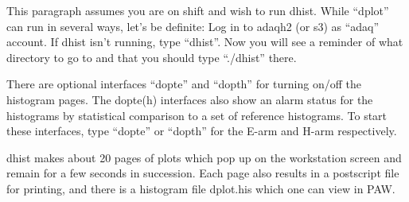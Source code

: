 \par 
This paragraph assumes you are on shift
and wish to run dhist.  
While ``dplot'' can run in
several ways, let's be definite:  Log in to
adaqh2 (or s3) as ``adaq'' account.  If dhist
isn't running, type ``dhist''.  Now you will
see a reminder of what directory to go to and
that you should type ``./dhist'' there.

\par 
There are optional interfaces ``dopte'' and 
``dopth'' for turning on/off the histogram
pages.  The dopte(h) interfaces also show an 
alarm status for the histograms by statistical
comparison to a set of reference histograms.
To start these interfaces, type ``dopte'' or
``dopth'' for the E-arm and H-arm respectively.

\par 
dhist makes about 20 pages of plots which pop
up on the workstation screen and remain for
a few seconds in succession.  Each page also
results in a postscript file for printing, and
there is a histogram file dplot.his which one
can view in PAW.    

%
